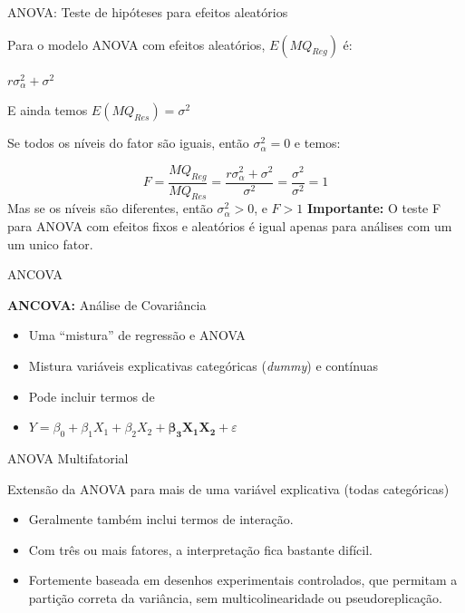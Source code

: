 \documentclass{beamer}\usepackage[]{graphicx}\usepackage[]{color}
\begin{document}
\begin{frame}{ANOVA: Teste de hipóteses para efeitos aleatórios}

Para o modelo ANOVA com efeitos aleatórios, $E(MQ_{Reg})$ é:
\vfill

$ r\sigma ^2 _\alpha + \sigma ^2$ \pause
\vfill

E ainda temos $E(MQ_{Res}) = \sigma^2$  \pause
\vfill

Se todos os níveis do fator são iguais, então $\sigma ^2 _\alpha = 0$ e temos:

\begin{equation*}
F = \frac{MQ_{Reg}}{MQ_{Res}} =  \frac{r\sigma ^2 _\alpha + \sigma ^2}{\sigma ^2} = \frac{\sigma^2}{\sigma^2} = 1
\end{equation*}
\vfill \pause
Mas se os níveis são diferentes, então $\sigma ^2 _\alpha > 0$, e $F > 1$
\vfill
\textbf{Importante:} O teste F para ANOVA com efeitos fixos e aleatórios é igual apenas para análises com um um unico fator.

\end{frame}

\begin{frame}{ANCOVA}

\textbf{ANCOVA:} Análise de Covariância
\vfill
\begin{itemize}
\item Uma ``mistura'' de regressão e ANOVA
\vfill
\item Mistura variáveis explicativas categóricas (\emph{dummy}) e contínuas
\vfill
\item Pode incluir termos de 
\vfill
\item $ Y = \beta _0 + \beta _1 X_1 + \beta _2 X_2 + \mathbf{ \boldsymbol{\beta} _3 X_1X_2} + \varepsilon$
\vfill
\end{itemize}

\end{frame}


\begin{frame}{ANOVA Multifatorial}

Extensão da ANOVA para mais de uma variável explicativa (todas categóricas)
\vfill
\begin{itemize}
\item Geralmente também inclui termos de interação.
\vfill
\item Com três ou mais fatores, a interpretação fica bastante difícil.
\vfill
\item Fortemente baseada em desenhos experimentais controlados, que permitam a partição correta da variância, sem multicolinearidade ou pseudoreplicação.
\vfill
\end{itemize}

\end{frame}
\end{document}
